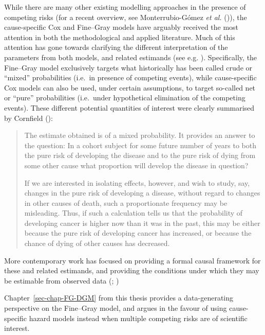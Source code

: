 \documentclass[
  letterpaper,
  DIV=11,
  numbers=noendperiod]{scrreprt}
\begin{document}
While there are many other existing modelling approaches in the presence
of competing risks (for a recent overview, see Monterrubio-Gómez
\emph{et al.}
()),
the cause-specific Cox and Fine--Gray models have arguably received the
most attention in both the methodological and applied literature. Much
of this attention has gone towards clarifying the different
interpretation of the parameters from both models, and related estimands
(see e.g.
). Specifically, the Fine--Gray model exclusively
targets what historically has been called crude or ``mixed''
probabilities (i.e.~in presence of competing events), while
cause-specific Cox models can also be used, under certain assumptions,
to target so-called net or ``pure'' probabilities (i.e.~under
hypothetical elimination of the competing events). These different
potential quantities of interest were clearly summarised by Cornfield
():

\begin{quote}
The estimate obtained is of a mixed probability. It provides an answer
to the question: In a cohort subject for some future number of years to
both the pure risk of developing the disease and to the pure risk of
dying from some other cause what proportion will develop the disease in
question?

If we are interested in isolating effects, however, and wish to study,
say, changes in the pure risk of developing a disease, without regard to
changes in other causes of death, such a proportionate frequency may be
misleading. Thus, if such a calculation tells us that the probability of
developing cancer is higher now than it was in the past, this may be
either because the pure risk of developing cancer has increased, or
because the chance of dying of other causes has decreased.
\end{quote}

More contemporary work has focused on providing a formal causal
framework for these and related estimands, and providing the conditions
under which they may be estimable from observed data
(;
)

Chapter~\ref{sec-chap-FG-DGM} from this thesis provides a
data-generating perspective on the Fine--Gray model, and argues in the
favour of using cause-specific hazard models instead when multiple
competing risks are of scientific interest.
\end{document}
